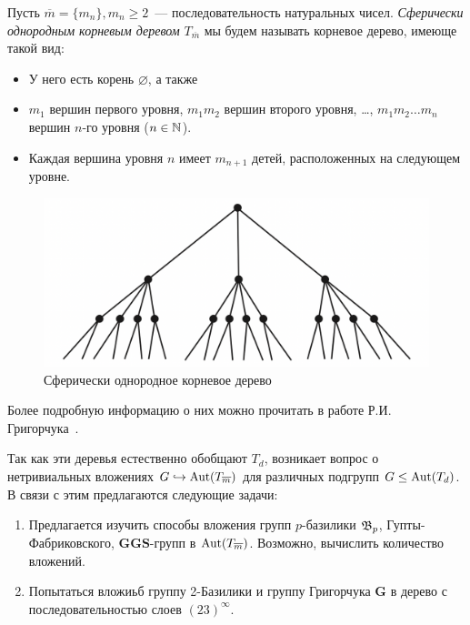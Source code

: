 \documentclass[12pt, oneside, dvipsnames]{extarticle}
\begin{document}
	\begin{definition} 
		Пусть $\overline{m} = \{ m_n \}, m_n \ge 2$~--- последовательность натуральных чисел. \emph{Сферически однородным корневым деревом} $T_{\overline{m}}$ мы будем называть корневое дерево, имеюще такой вид: 	
		\begin{itemize}
			\item У него есть корень $\varnothing$, а также 
			\item $m_1$ вершин первого уровня, $m_1 m_2$ вершин второго уровня, \ldots, $m_1 m_2 \ldots m_n$ вершин $n$-го уровня ($n \in \mathbb{N}$).
			\item Каждая вершина уровня $n$ имеет $m_{n + 1}$ детей, расположенных на следующем уровне.
		\end{itemize}
	\end{definition}	

	\begin{figure}[tbph]
		\centering
		\includegraphics[scale = 0.5]{pictures/pic_3.png}
		\caption{Сферически однородное корневое дерево}
		\label{fig:pic_3.png}
	\end{figure}

	Более подробную информацию о них можно прочитать в работе Р.И. Григорчука~\cite[стр. 80 и далее]{Grig_Sperical}. 

	Так как эти деревья естественно обобщают $T_{d}$, возникает вопрос о нетривиальных вложениях $ G  \hookrightarrow \operatorname{Aut}(T_{\overline{m}})$ для различных подгрупп $G \le \operatorname{Aut}(T_{d})$. В связи с этим предлагаются следующие задачи: 

	\begin{enumerate}
		\item Предлагается изучить способы вложения групп $p$-базилики $\mathfrak{B}_{p}$, Гупты-Фабриковского, $\mathbf{GGS}$-групп в $\operatorname{Aut}(T_{\overline{m}})$. Возможно, вычислить количество вложений. 

		\item Попытаться  вложиьб группу 2-Базилики и группу Григорчука $\mathbf{G}$ в дерево с последовательностью слоев $(23)^\infty$.
	\end{enumerate}
\end{document}
